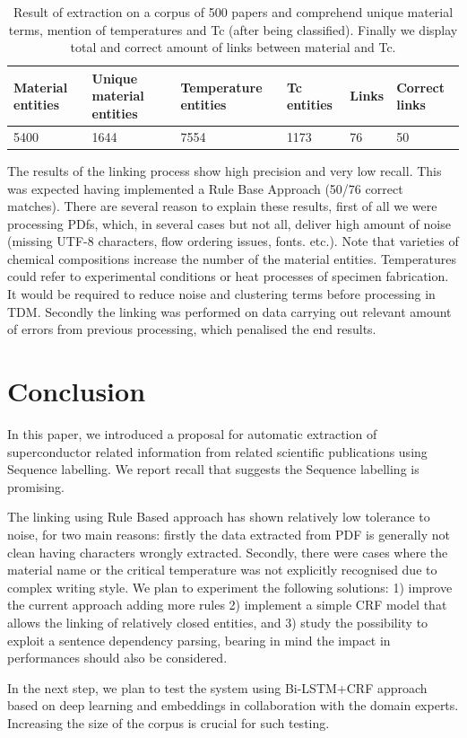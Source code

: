 \documentclass{article}[a4]
\begin{document}
\begin{table}[h!]
    \centering
    \begin{tabular}{ | m{4em} | m{4em} | m{6em} | m{5em} | m{3em} | m{4em}| } 
    \hline
        Material entities & Unique material entities & Temperature entities & Tc entities & Links & Correct links  \\
    \hline
        5400 & 1644 & 7554 & 1173 & 76 & 50 \\ 
    \hline
    \end{tabular}
    \label{table:result-extraction}
    \caption{Result of extraction on a corpus of 500 papers and comprehend unique material terms, mention of temperatures and Tc (after being classified). Finally we display total and correct amount of links between material and Tc.}    
\end{table}

The results of the linking process show high precision and very low recall. This was expected having implemented a Rule Base Approach (50/76 correct matches). There are several reason to explain these results, first of all we were processing PDfs, which, in several cases but not all, deliver high amount of noise (missing UTF-8 characters, flow ordering issues, fonts. etc.). Note that varieties of chemical compositions increase the number of the material entities. Temperatures could refer to experimental conditions or heat processes of specimen fabrication. It would be required to reduce noise and clustering terms before processing in TDM. Secondly the linking was performed on data carrying out relevant amount of errors from previous processing, which penalised the end results. 




\section{Conclusion}
\label{sec:conclusion}
In this paper, we introduced a proposal for automatic extraction of superconductor related information from related scientific publications using Sequence labelling. We report recall that suggests the Sequence labelling is promising.

The linking using Rule Based approach has shown relatively low tolerance to noise, for two main reasons: firstly the data extracted from PDF is generally not clean having characters wrongly extracted. Secondly, there were cases where the material name or the critical temperature was not explicitly recognised due to complex writing style.
We plan to experiment the following solutions: 1) improve the current approach adding more rules 2) implement a simple CRF model that allows the linking of relatively closed entities, and 3) study the possibility to exploit a sentence dependency parsing, bearing in mind the impact in performances should also be considered.

In the next step, we plan to test the system using Bi-LSTM+CRF approach based on deep learning and embeddings in collaboration with the domain experts. Increasing the size of the corpus is crucial for such testing. 



% 
\pagebreak



\end{document}
